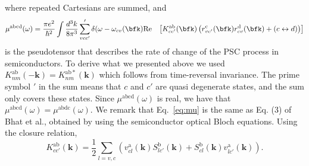 \documentclass[floatfix,prb,aps,superscriptaddress,showpacs,11pt,preprint,letterpaper]{revtex4}
\begin{document}
where repeated Cartesians are summed, and 
\begin{equation}\label{eq:mu}
\begin{aligned}
\mu^{\mathrm{abcd}}  (\omega) &
=
\frac{\pi e^{2}}{\hbar^{2}} \int 
\frac{d^{3}k}{8 \pi^{3}} \sum'_{vcc'}
  \delta(\omega-\omega_{cv}(\bfk) 
\mathrm{Re} & \left[ K^{\mathrm{ab}}_{cc'}(\bfk) 
\left(  
r^{\mathrm{c}}_{vc'}(\bfk)   
r^{\mathrm{d}}_{cv }(\bfk)  +
(c \leftrightarrow d)  
\right) 
\right]
\end{aligned}
\end{equation} 
is the pseudotensor that describes the rate of change of the  PSC process in
semiconductors. To derive what we presented above we used
$
K^{\mathrm{ab}}_{nm}(\mathbf{-k}) = K^{\mathrm{ab*}}_{nm}(\mathbf{k}) 
$
which follows from time-reversal invariance. The prime symbol $'$ in the sum means that
$c$ and $c'$ are quasi degenerate states, and the sum only covers these states.
Since $\mu^{\mathrm{abcd}}(\omega)$ is real, we have that
$\mu^{\mathrm{abcd}}(\omega) =
\mu^{\mathrm{abdc}}(\omega)$. 
We remark that Eq.~\eqref{eq:mu} 
is the same as Eq. (3) of Bhat et al.\cite{bhatPRL05},
obtained by using the semiconductor optical Bloch equations.
Using the closure relation,
\begin{equation}
K^{\mathrm{ab}}_{cc'}(\mathbf{k}) = \frac{1}{2}
\sum_{l=v,c}
\left(v^{\mathrm{a}}_{cl}(\mathbf{k})S^{\mathrm{b}}_{lc'}(\mathbf{k})
+S^{\mathrm{b}}_{cl}(\mathbf{k}) v^{\mathrm{a}}_{lc'}(\mathbf{k})
\right)
.
\label{eq:velspimatelem}
\end{equation}

\end{document}
